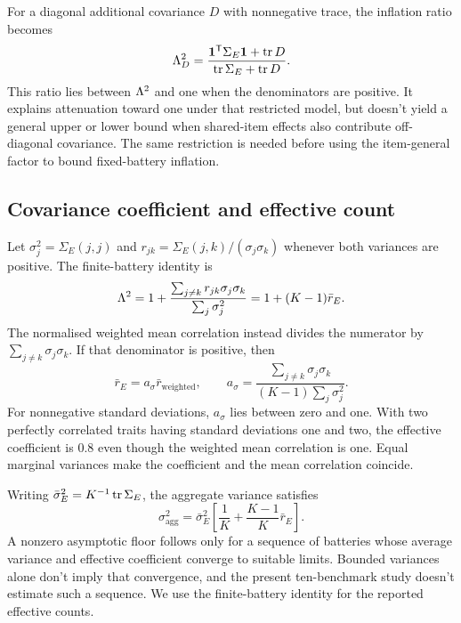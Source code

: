 For a diagonal additional covariance $D$ with nonnegative trace, the inflation ratio becomes
\begin{equation}
\Lambda_D^2=\frac{\mathbf1^{\mathsf T}\Sigma_E\mathbf1+\operatorname{tr}D}
{\operatorname{tr}\Sigma_E+\operatorname{tr}D}.
\end{equation}
This ratio lies between $\Lambda^2$ and one when the denominators are positive. It explains attenuation toward one under that restricted model, but doesn't yield a general upper or lower bound when shared-item effects also contribute off-diagonal covariance. The same restriction is needed before using the item-general factor to bound fixed-battery inflation.

\subsection{Covariance coefficient and effective count}
Let $\sigma_j^2=\Sigma_E(j,j)$ and $r_{jk}=\Sigma_E(j,k)/(\sigma_j\sigma_k)$ whenever both variances are positive. The finite-battery identity is
\begin{equation}
\Lambda^2=1+\frac{\sum_{j\ne k}r_{jk}\sigma_j\sigma_k}{\sum_j\sigma_j^2}
=1+(K-1)\bar r_E.
\end{equation}
The normalised weighted mean correlation instead divides the numerator by $\sum_{j\ne k}\sigma_j\sigma_k$. If that denominator is positive, then
\begin{equation}
\bar r_E=a_\sigma\bar r_{\mathrm{weighted}},\qquad
a_\sigma=\frac{\sum_{j\ne k}\sigma_j\sigma_k}{(K-1)\sum_j\sigma_j^2}.
\end{equation}
For nonnegative standard deviations, $a_\sigma$ lies between zero and one. With two perfectly correlated traits having standard deviations one and two, the effective coefficient is 0.8 even though the weighted mean correlation is one. Equal marginal variances make the coefficient and the mean correlation coincide.

Writing $\bar\sigma_E^2=K^{-1}\operatorname{tr}\Sigma_E$, the aggregate variance satisfies
\begin{equation}
\sigma_{\mathrm{agg}}^2=\bar\sigma_E^2\left[\frac1K+\frac{K-1}{K}\bar r_E\right].
\end{equation}
A nonzero asymptotic floor follows only for a sequence of batteries whose average variance and effective coefficient converge to suitable limits. Bounded variances alone don't imply that convergence, and the present ten-benchmark study doesn't estimate such a sequence. We use the finite-battery identity for the reported effective counts.

